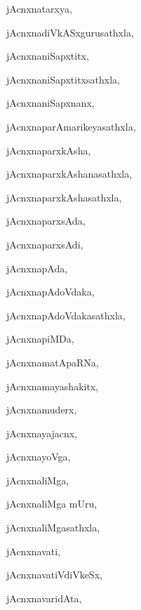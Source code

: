 \begin{multicols}{3}
{\noindent
{jAcnxnatarxya}, \pageref{jAcnxnatarxya}

\noindent
{jAcnxnadiVkASxgurusathxla}, \pageref{jAcnxnadiVkASxgurusathxla}

\noindent
{jAcnxnaniSapxtitx}, \pageref{jAcnxnaniSapxtitx}

\noindent
{jAcnxnaniSapxtitxsathxla}, \pageref{jAcnxnaniSapxtitxsathxla}

\noindent
{jAcnxnaniSapxnanx}, \pageref{jAcnxnaniSapxnanx}

\noindent
{jAcnxnaparAmarikeyasathxla}, \pageref{jAcnxnaparAmarikeyasathxla}

\noindent
{jAcnxnaparxkAsha}, \pageref{jAcnxnaparxkAsha}

\noindent
{jAcnxnaparxkAshanasathxla}, \pageref{jAcnxnaparxkAshanasathxla}

\noindent
{jAcnxnaparxkAshasathxla}, \pageref{jAcnxnaparxkAshasathxla}

\noindent
{jAcnxnaparxsAda}, \pageref{jAcnxnaparxsAda}

\noindent
{jAcnxnaparxsAdi}, \pageref{jAcnxnaparxsAdi}

\noindent
{jAcnxnapAda}, \pageref{jAcnxnapAda}

\noindent
{jAcnxnapAdoVdaka}, \pageref{jAcnxnapAdoVdaka}

\noindent
{jAcnxnapAdoVdakasathxla}, \pageref{jAcnxnapAdoVdakasathxla}

\noindent
{jAcnxnapiMDa}, \pageref{jAcnxnapiMDa}

\noindent
{jAcnxnamatApaRNa}, \pageref{jAcnxnamatApaRNa}

\noindent
{jAcnxnamayashakitx}, \pageref{jAcnxnamayashakitx}

\noindent
{jAcnxnamuderx}, \pageref{jAcnxnamuderx}

\noindent
{jAcnxnayajacnx}, \pageref{jAcnxnayajacnx}

\noindent
{jAcnxnayoVga}, \pageref{jAcnxnayoVga}

\noindent
{jAcnxnaliMga}, \pageref{jAcnxnaliMga}

\noindent
{jAcnxnaliMga mUru}, \pageref{jAcnxnaliMga mUru}

\noindent
{jAcnxnaliMgasathxla}, \pageref{jAcnxnaliMgasathxla}

\noindent
{jAcnxnavati}, \pageref{jAcnxnavati}

\noindent
{jAcnxnavatiVdiVkeSx}, \pageref{jAcnxnavatiVdiVkeSx}

\noindent
{jAcnxnavaridAta}, \pageref{jAcnxnavaridAta}

}
\end{multicols}
